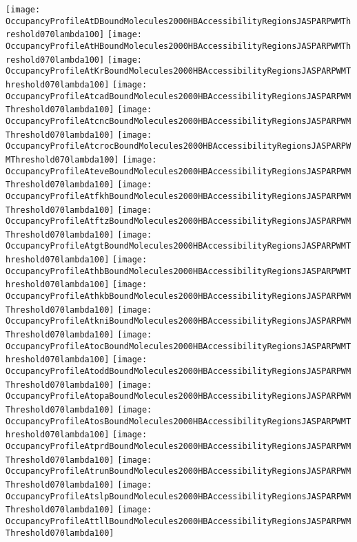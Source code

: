 \documentclass[11pt]{article}
\begin{document}
 


\begin{center}
\texttt{[image: OccupancyProfileAtDBoundMolecules2000HBAccessibilityRegionsJASPARPWMThreshold070lambda100]}
\texttt{[image: OccupancyProfileAtHBoundMolecules2000HBAccessibilityRegionsJASPARPWMThreshold070lambda100]}
\texttt{[image: OccupancyProfileAtKrBoundMolecules2000HBAccessibilityRegionsJASPARPWMThreshold070lambda100]}
\texttt{[image: OccupancyProfileAtcadBoundMolecules2000HBAccessibilityRegionsJASPARPWMThreshold070lambda100]}
\texttt{[image: OccupancyProfileAtcncBoundMolecules2000HBAccessibilityRegionsJASPARPWMThreshold070lambda100]}
\texttt{[image: OccupancyProfileAtcrocBoundMolecules2000HBAccessibilityRegionsJASPARPWMThreshold070lambda100]}
\texttt{[image: OccupancyProfileAteveBoundMolecules2000HBAccessibilityRegionsJASPARPWMThreshold070lambda100]}
\texttt{[image: OccupancyProfileAtfkhBoundMolecules2000HBAccessibilityRegionsJASPARPWMThreshold070lambda100]}
\texttt{[image: OccupancyProfileAtftzBoundMolecules2000HBAccessibilityRegionsJASPARPWMThreshold070lambda100]}
\texttt{[image: OccupancyProfileAtgtBoundMolecules2000HBAccessibilityRegionsJASPARPWMThreshold070lambda100]}
\texttt{[image: OccupancyProfileAthbBoundMolecules2000HBAccessibilityRegionsJASPARPWMThreshold070lambda100]}
\texttt{[image: OccupancyProfileAthkbBoundMolecules2000HBAccessibilityRegionsJASPARPWMThreshold070lambda100]}
\texttt{[image: OccupancyProfileAtkniBoundMolecules2000HBAccessibilityRegionsJASPARPWMThreshold070lambda100]}
\texttt{[image: OccupancyProfileAtocBoundMolecules2000HBAccessibilityRegionsJASPARPWMThreshold070lambda100]}
\texttt{[image: OccupancyProfileAtoddBoundMolecules2000HBAccessibilityRegionsJASPARPWMThreshold070lambda100]}
\texttt{[image: OccupancyProfileAtopaBoundMolecules2000HBAccessibilityRegionsJASPARPWMThreshold070lambda100]}
\texttt{[image: OccupancyProfileAtosBoundMolecules2000HBAccessibilityRegionsJASPARPWMThreshold070lambda100]}
\texttt{[image: OccupancyProfileAtprdBoundMolecules2000HBAccessibilityRegionsJASPARPWMThreshold070lambda100]}
\texttt{[image: OccupancyProfileAtrunBoundMolecules2000HBAccessibilityRegionsJASPARPWMThreshold070lambda100]}
\texttt{[image: OccupancyProfileAtslpBoundMolecules2000HBAccessibilityRegionsJASPARPWMThreshold070lambda100]}
\texttt{[image: OccupancyProfileAttllBoundMolecules2000HBAccessibilityRegionsJASPARPWMThreshold070lambda100]}
\end{center}


\end{document}
